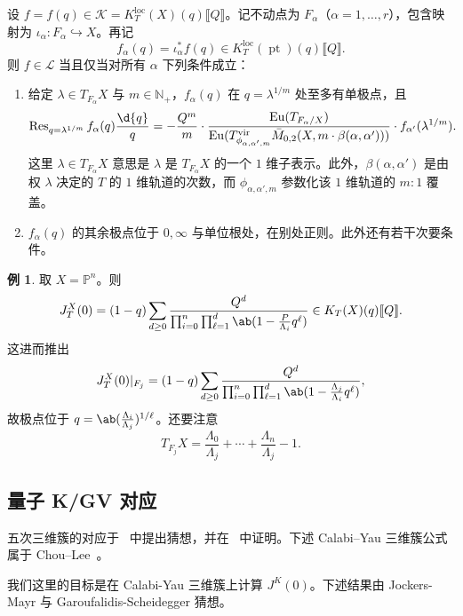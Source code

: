 \documentclass{amsart}
\theoremstyle{definition}
\newtheorem{exm}[thm]{例}
\theoremstyle{remark}
\theoremstyle{plain}
\theoremstyle{definition}
\theoremstyle{remark}
\newcommand{\N}{\mathbb{N}}
\renewcommand{\P}{\mathbb{P}}
\newcommand{\mc}[1]{\mathcal{#1}}
\newcommand{\mr}[1]{\mathrm{#1}}
\newcommand{\on}[1]{\operatorname{#1}}
\newcommand{\1}{\mathbf{1}}
\newcommand{\2}{\mathbf{2}}
\newcommand{\3}{\mathbf{3}}
\newcommand{\vir}{\mr{vir}}
\newcommand{\ps}[1]{\llbracket #1 \rrbracket}
\newcommand{\loc}{\mr{loc}}
\begin{document}
设 \(f = f(q) \in \mc{K} = K_T^{\loc}(X)(q)\ps{Q}\)。记不动点为 \(F_{\alpha}\)（\(\alpha = 1, \ldots, r\)），包含映射为 \(\iota_{\alpha} \colon F_{\alpha} \hookrightarrow X\)。再记
\[ f_{\alpha}(q) = \iota_{\alpha}^* f(q) \in K_T^{\loc}(\on{pt})(q)\ps{Q}. \]
则 \(f \in \mc{L}\) 当且仅当对所有 \(\alpha\) 下列条件成立：
\begin{enumerate}
    \item 给定 \(\lambda \in T_{F_{\alpha}} X\) 与 \(m \in \N_+\)，\(f_{\alpha}(q)\) 在 \(q = \lambda^{1/m}\) 处至多有单极点，且
        \[ \on{Res}_{q = \lambda^{1/m}} f_{\alpha}(q) \frac{\d{q}}{q} = -\frac{Q^m}{m} \cdot \frac{\on{Eu}(T_{F_{\alpha}/X})}{\on{Eu}(T^{\vir}_{\phi_{\alpha,\alpha',m}}\bar{M}_{0,2}(X, m \cdot \beta(\alpha, \alpha')))} \cdot f_{\alpha'}(\lambda^{1/m}). \]
        这里 \(\lambda \in T_{F_{\alpha}}X\) 意思是 \(\lambda\) 是 \(T_{F_{\alpha}} X\) 的一个 \(1\) 维子表示。此外，\(\beta(\alpha,\alpha')\) 是由权 \(\lambda\) 决定的 \(T\) 的 \(1\) 维轨道的次数，而 \(\phi_{\alpha, \alpha', m}\) 参数化该 \(1\) 维轨道的 \(m:1\) 覆盖。
    \item \(f_{\alpha}(q)\) 的其余极点位于 \(0, \infty\) 与单位根处，在别处正则。此外还有若干次要条件。
\end{enumerate}

\begin{exm}
    取 \(X = \P^n\)。则
    \[ J_T^X(0) = (1-q) \sum_{d \geq 0} \frac{Q^d}{\prod_{i=0}^n \prod_{\ell = 1}^d \ab(1 - \frac{P}{\Lambda_i} q^{\ell})} \in K_T(X)(q) \ps{Q}. \]
    这进而推出
    \[ J_T^X(0) |_{F_j} = (1-q) \sum_{d \geq 0} \frac{Q^d}{\prod_{i=0}^n \prod_{\ell = 1}^d \ab(1 - \frac{\Lambda_j}{\Lambda_i}q^{\ell})}, \]
    故极点位于 \(q = \ab(\frac{\Lambda_i}{\Lambda_j})^{1/\ell}\)。还要注意
    \[ T_{F_j} X = \frac{\Lambda_0}{\Lambda_j} + \cdots + \frac{\Lambda_n}{\Lambda_j} - 1. \]
\end{exm}

\subsection{量子 K/GV 对应}%
\label{sub:Quantum K/GV correspondence}

五次三维簇的对应于~\cite{GaroufalidisScheidegger2022} 中提出猜想，并在~\cite{ChouLeeQuintic} 中证明。下述 Calabi--Yau 三维簇公式属于 Chou--Lee~\cite{ChouLee2025}。

我们这里的目标是在 Calabi-Yau 三维簇上计算 \(J^K(0)\)。下述结果由 Jockers-Mayr 与 Garoufalidis-Scheidegger 猜想。
\end{document}
